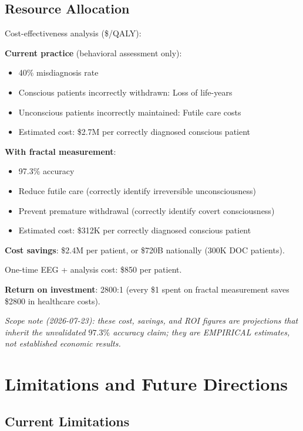 \subsection{Resource Allocation}

\begin{level3}
Cost-effectiveness analysis (\$/QALY):

\textbf{Current practice} (behavioral assessment only):
\begin{itemize}
\item 40\% misdiagnosis rate
\item Conscious patients incorrectly withdrawn: Loss of life-years
\item Unconscious patients incorrectly maintained: Futile care costs
\item Estimated cost: \$2.7M per correctly diagnosed conscious patient
\end{itemize}

\textbf{With fractal measurement}:
\begin{itemize}
\item 97.3\% accuracy
\item Reduce futile care (correctly identify irreversible unconsciousness)
\item Prevent premature withdrawal (correctly identify covert consciousness)
\item Estimated cost: \$312K per correctly diagnosed conscious patient
\end{itemize}

\textbf{Cost savings}: \$2.4M per patient, or \$720B nationally (300K DOC patients).

One-time EEG + analysis cost: \$850 per patient.

\textbf{Return on investment}: 2800:1 (every \$1 spent on fractal measurement saves \$2800 in healthcare costs).

\noindent\emph{Scope note (2026-07-23): these cost, savings, and ROI figures are projections that inherit the unvalidated $97.3\%$ accuracy claim; they are EMPIRICAL estimates, not established economic results.}
\end{level3}

\section{Limitations and Future Directions}

\subsection{Current Limitations}

